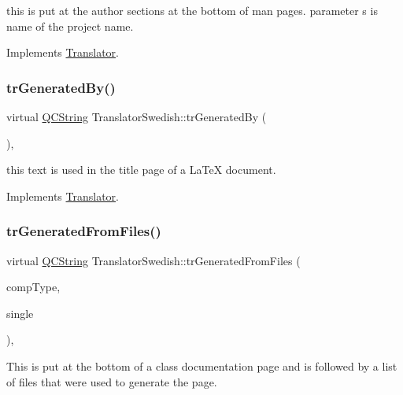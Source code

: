 this is put at the author sections at the bottom of man pages. parameter s is name of the project name. 

Implements \mbox{\hyperlink{class_translator}{Translator}}.

\mbox{\label{class_translator_swedish_ade916813a3c00f0b93244543c723cc34}} 
\subsubsection{\texorpdfstring{trGeneratedBy()}{trGeneratedBy()}}
{\footnotesize\ttfamily virtual \mbox{\hyperlink{class_q_c_string}{Q\+C\+String}} Translator\+Swedish\+::tr\+Generated\+By (\begin{DoxyParamCaption}{ }\end{DoxyParamCaption})\hspace{0.3cm}{\ttfamily [inline]}, {\ttfamily [virtual]}}

this text is used in the title page of a La\+TeX document. 

Implements \mbox{\hyperlink{class_translator}{Translator}}.

\mbox{\label{class_translator_swedish_a4a3c6ad38d0fa4bc55ab132f0f545785}} 
\subsubsection{\texorpdfstring{trGeneratedFromFiles()}{trGeneratedFromFiles()}}
{\footnotesize\ttfamily virtual \mbox{\hyperlink{class_q_c_string}{Q\+C\+String}} Translator\+Swedish\+::tr\+Generated\+From\+Files (\begin{DoxyParamCaption}\item[{\mbox{\hyperlink{class_class_def_ae70cf86d35fe954a94c566fbcfc87939}{Class\+Def\+::\+Compound\+Type}}}]{comp\+Type,  }\item[{bool}]{single }\end{DoxyParamCaption})\hspace{0.3cm}{\ttfamily [inline]}, {\ttfamily [virtual]}}

This is put at the bottom of a class documentation page and is followed by a list of files that were used to generate the page. 

